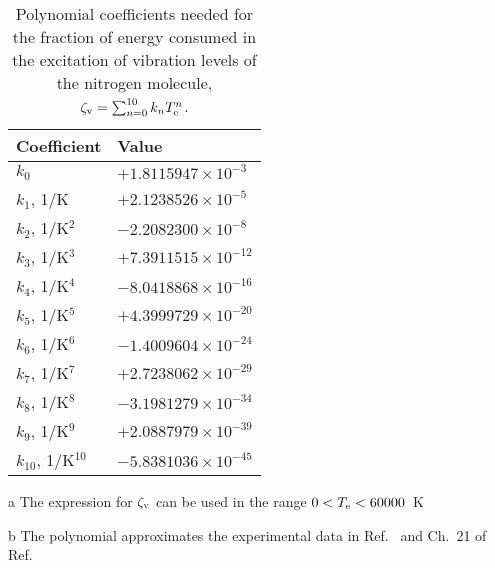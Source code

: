 \documentclass{warpdoc}
\renewcommand{\fontsizetable}{\scalefont{0.85}}
\let\citen\cite
\begin{document}
%
\begin{table*}
  \center\fontsizetable
  \begin{threeparttable}
    \caption{Polynomial coefficients needed for the fraction of energy consumed in the excitation of vibration levels of the nitrogen molecule, $\zeta_{\rm v}=\sum_{n=0}^{10} k_n T_{\rm e}^n$.} 
    \label{tab:etavcoefficients}
    \fontsizetable
    \begin{tabular*}{\textwidth}{ll}
    \toprule
      Coefficient & Value    \\
    \midrule
      $k_0$          & $+1.8115947\times 10^{-3}$   \\
      $k_1$, 1/K     & $+2.1238526\times 10^{-5}$   \\
      $k_2$, 1/K$^2$ & $-2.2082300\times 10^{-8}$  \\
      $k_3$, 1/K$^3$ & $+7.3911515\times 10^{-12}$  \\
      $k_4$, 1/K$^4$ & $-8.0418868\times 10^{-16}$  \\
      $k_5$, 1/K$^5$ & $+4.3999729\times 10^{-20}$  \\
      $k_6$, 1/K$^6$ & $-1.4009604\times 10^{-24}$  \\
      $k_7$, 1/K$^7$ & $+2.7238062\times 10^{-29}$  \\
      $k_8$, 1/K$^8$ & $-3.1981279\times 10^{-34}$  \\
      $k_9$, 1/K$^9$ & $+2.0887979\times 10^{-39}$  \\
      $k_{10}$, 1/K$^{10}$ & $-5.8381036\times 10^{-45}$  \\
    \bottomrule
    \end{tabular*}
 \begin{tablenotes}
   \item[a] The expression for $\zeta_{\rm v}$ can be used in the range $0<T_{\rm e}<60000$~K
   \item[b] The polynomial approximates the experimental data in Ref.\ \cite{misc:1981:aleksandrov} and Ch.\ 21 of Ref.\ \citen{book:1997:grigoriev}
 \end{tablenotes}
   \end{threeparttable}
\end{table*}
%
\end{document}
